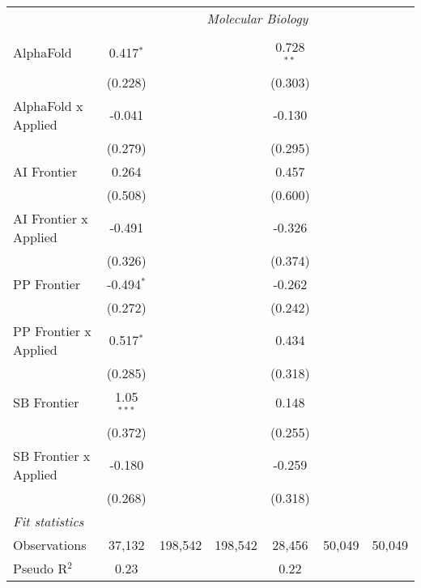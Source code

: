 \begin{tabular}{lcccccc}
 & \multicolumn{6}{c}{\textit{Molecular Biology}} \\ \\
   AlphaFold             & 0.417$^{*}$  &         &         & 0.728$^{**}$ &        &   \\   
                         & (0.228)      &         &         & (0.303)      &        &   \\   
   AlphaFold x Applied   & -0.041       &         &         & -0.130       &        &   \\   
                         & (0.279)      &         &         & (0.295)      &        &   \\   
   AI Frontier           & 0.264        &         &         & 0.457        &        &   \\   
                         & (0.508)      &         &         & (0.600)      &        &   \\   
   AI Frontier x Applied & -0.491       &         &         & -0.326       &        &   \\   
                         & (0.326)      &         &         & (0.374)      &        &   \\   
   PP Frontier           & -0.494$^{*}$ &         &         & -0.262       &        &   \\   
                         & (0.272)      &         &         & (0.242)      &        &   \\   
   PP Frontier x Applied & 0.517$^{*}$  &         &         & 0.434        &        &   \\   
                         & (0.285)      &         &         & (0.318)      &        &   \\   
   SB Frontier           & 1.05$^{***}$ &         &         & 0.148        &        &   \\   
                         & (0.372)      &         &         & (0.255)      &        &   \\   
   SB Frontier x Applied & -0.180       &         &         & -0.259       &        &   \\   
                         & (0.268)      &         &         & (0.318)      &        &   \\   
   \midrule
   \emph{Fit statistics}\\
   Observations          & 37,132       & 198,542 & 198,542 & 28,456       & 50,049 & 50,049\\  
   Pseudo R$^2$          & 0.23         &         &         & 0.22         &        & \\  
   

\end{tabular}
